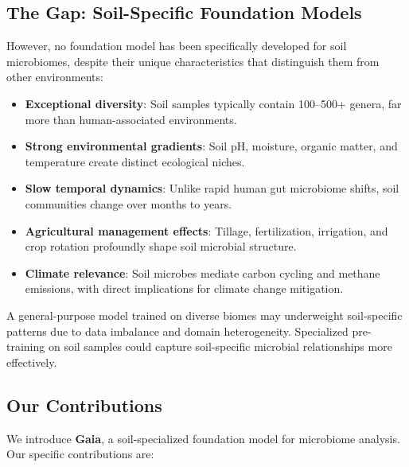 \documentclass[11pt,a4paper]{article}
\begin{document}
\subsection{The Gap: Soil-Specific Foundation Models}

However, no foundation model has been specifically developed for soil microbiomes, despite their unique characteristics that distinguish them from other environments:

\begin{itemize}[leftmargin=1.5em]
    \item \textbf{Exceptional diversity}: Soil samples typically contain 100--500+ genera, far more than human-associated environments.
    \item \textbf{Strong environmental gradients}: Soil pH, moisture, organic matter, and temperature create distinct ecological niches.
    \item \textbf{Slow temporal dynamics}: Unlike rapid human gut microbiome shifts, soil communities change over months to years.
    \item \textbf{Agricultural management effects}: Tillage, fertilization, irrigation, and crop rotation profoundly shape soil microbial structure.
    \item \textbf{Climate relevance}: Soil microbes mediate carbon cycling and methane emissions, with direct implications for climate change mitigation.
\end{itemize}

A general-purpose model trained on diverse biomes may underweight soil-specific patterns due to data imbalance and domain heterogeneity. Specialized pre-training on soil samples could capture soil-specific microbial relationships more effectively.

\subsection{Our Contributions}

We introduce \textbf{Gaia}, a soil-specialized foundation model for microbiome analysis. Our specific contributions are:
\end{document}
